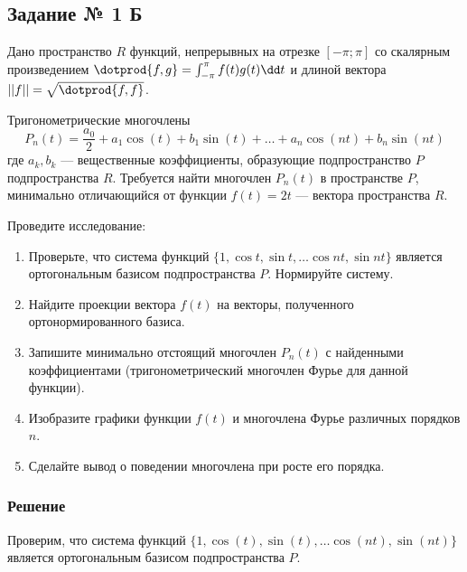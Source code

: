 \subsection{Задание № 1 Б}

Дано пространство \(R\) функций, непрерывных на отрезке \([-\pi; \pi]\)
со скалярным произведением
\(\dotprod{f, g} = \int_{-\pi}^{\pi} f(t) g(t) \dd t \)
и длиной вектора \(||f|| = \sqrt{\dotprod{f, f}}\).

Тригонометрические многочлены
\[
  P_{n}(t) = \frac{a_0}{2} + a_1 \cos(t) + b_1 \sin(t) + \ldots
  + a_n \cos(n t) + b_n \sin(n t)
\]
где \(a_k, b_k\) --- вещественные коэффициенты,
образующие подпространство \(P\) подпространства \(R\).
Требуется найти многочлен \(P_{n}(t)\) в пространстве \(P\),
минимально отличающийся от функции \(f(t) = 2t\)
--- вектора пространства \(R\).

Проведите исследование:
\begin{enumerate}
  \item Проверьте, что система функций
    \(\{1, \cos t, \sin t, \ldots \cos n t, \sin n t\}\) является
    ортогональным базисом подпространства \(P\).
    Нормируйте систему.
  \item Найдите проекции вектора \(f(t)\) на векторы,
    полученного ортонормированного базиса.
  \item Запишите минимально отстоящий многочлен \(P_{n}(t)\)
    с найденными коэффициентами
    (тригонометрический многочлен Фурье для данной функции).
  \item Изобразите графики функции \(f(t)\)
    и многочлена Фурье различных порядков \(n\).
  \item Сделайте вывод о поведении многочлена при росте его порядка.
\end{enumerate}

\subsubsection{Решение}

Проверим, что система функций
\(\{1, \cos(t), \sin(t), \ldots \cos(nt), \sin(nt)\}\)
является ортогональным базисом подпространства \(P\).

